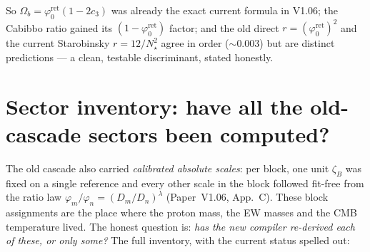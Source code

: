 \documentclass[11pt,a4paper]{article}
\newcommand{\cthree}{c_3}
\newcommand{\phiz}{\varphi_0^{\mathrm{ret}}}
\theoremstyle{definition}
\begin{document}
\noindent So $\Omega_b=\phiz(1-2\cthree)$ was already the exact current formula in V1.06; the Cabibbo
ratio gained its $(1-\phiz)$ factor; and the old direct $r=(\phiz)^2$ and the current Starobinsky
$r=12/N_\star^2$ agree in order ($\sim0.003$) but are distinct predictions --- a clean, testable
discriminant, stated honestly.

\section{Sector inventory: have all the old-cascade sectors been computed?}\label{sec:sectorcov}
The old cascade also carried \emph{calibrated absolute scales}: per block, one unit $\zeta_B$ was fixed on
a single reference and every other scale in the block followed fit-free from the ratio law
$\varphi_m/\varphi_n=(D_m/D_n)^\lambda$ (Paper~V1.06, App.~C). These block assignments are the place where
the proton mass, the EW masses and the CMB temperature lived. The honest question is: \emph{has the new
compiler re-derived each of these, or only some?} The full inventory, with the current status spelled out:
\end{document}
